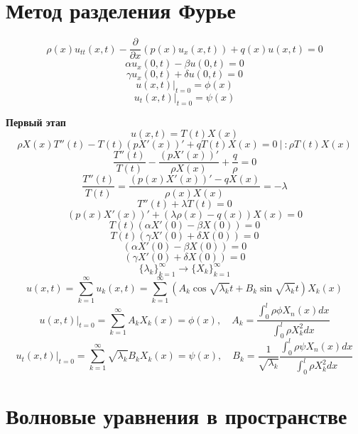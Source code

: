 \documentclass[a4paper]{article}
\begin{document}
\section*{\centering Метод разделения Фурье}
\begin{equation}
    \rho(x) u_{t t}(x,t) - \frac{\partial}{\partial x} ( p(x) u_x(x,t)) + 
    q(x) u(x,t) = 0
\end{equation}
\begin{equation}
    \alpha u_x(0,t) - \beta u(0,t) = 0
\end{equation}
\begin{equation}
    \gamma u_x(0,t) + \delta u(0,t) = 0
\end{equation}
\begin{equation}
    u(x,t) |_{t=0} = \phi(x)
\end{equation}
\begin{equation}
    u_t(x,t) |_{t = 0} = \psi(x)
\end{equation}

\textbf{Первый этап}
\begin{equation}
    u(x,t) = T(t)X(x)
\end{equation}
\[
    \rho X(x) T''(t) - T(t) (p X'(x))' + q T(t) X(x) = 0 \ | \ : \rho T(t) X(x)
\]
\[
    \frac{T''(t)}{T(t)} - \frac{(pX'(x))'}{\rho X(x)} + \frac{q}{\rho} = 0
\]
\[
    \frac{T''(t)}{T(t)} = \frac{(p(x) X'(x))' - q X(x)}{\rho(x) X(x)} = -\lambda  
\]
\[
    T''(t) + \lambda T(t) = 0
\]
\[
    (p(x) X'(x))' + (\lambda \rho(x) - q(x)) X(x) = 0
\]
\[
    T(t) (\alpha X'(0) - \beta X(0)) = 0
\]
\[
    T(t) (\gamma X'(0) + \delta X(0)) = 0
\]
\[
    (\alpha X'(0) - \beta X(0)) = 0
\]
\[
    (\gamma X'(0) + \delta X(0)) = 0
\]
\[
    \{ \lambda_k \}_{k=1}^{\infty} \to \{ X_k \}_{k = 1}^{\infty}
\]
\[
    u(x,t) = \sum_{k=1}^{\infty} u_k(x,t)  =\sum_{k=1}^{\infty} (A_k \cos \sqrt{\lambda_k} t + B_k
    \sin \sqrt{\lambda_k} t) X_k(x)
\]
\[
    u(x,t)|_{t=0} = \sum_{k=1}^{\infty} A_k X_k(x) = \phi(x), \quad
    A_k = \frac{\int_{0}^{l} \rho \phi X_n(x) dx}{\int_{0}^{l} \rho X_k^2 dx} 
\]
\[
    u_t(x,t)|_{t=0} = \sum_{k=1}^{\infty} \sqrt{\lambda_k} B_k X_k(x) = \psi(x), \quad
    B_k = \frac{1}{\sqrt{\lambda_k} } \frac{\int_{0}^{l} \rho \psi X_n(x) dx}{\int_{0}^{l} \rho X_k^2 dx} 
\]

\section*{\centering Волновые уравнения в пространстве}
\end{document}
